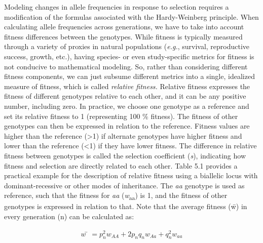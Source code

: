 \documentclass[
]{book}
\begin{document}
Modeling changes in allele frequencies in response to selection requires a modification of the formulas associated with the Hardy-Weinberg principle. When calculating allele frequencies across generations, we have to take into account fitness differences between the genotypes. While fitness is typically measured through a variety of proxies in natural populations (\emph{e.g.}, survival, reproductive success, growth, etc.), having species- or even study-specific metrics for fitness is not conducive to mathematical modeling. So, rather than considering different fitness components, we can just subsume different metrics into a single, idealized measure of fitness, which is called \emph{relative fitness.} Relative fitness expresses the fitness of different genotypes relative to each other, and it can be any positive number, including zero. In practice, we choose one genotype as a reference and set its relative fitness to 1 (representing 100 \% fitness). The fitness of other genotypes can then be expressed in relation to the reference. Fitness values are higher than the reference (\textgreater1) if alternate genotypes have higher fitness and lower than the reference (\textless1) if they have lower fitness. The difference in relative fitness between genotypes is called the selection coefficient (\emph{s}), indicating how fitness and selection are directly related to each other. Table 5.1 provides a practical example for the description of relative fitness using a biallelic locus with dominant-recessive or other modes of inheritance. The \emph{aa} genotype is used as reference, such that the fitness for \emph{aa} (\emph{w}\textsubscript{aa}) is 1, and the fitness of other genotypes is expressed in relation to that. Note that the average fitness (w̄) in every generation (n) can be calculated as:

\begin{align} 
w̄=p_n^2w_{AA}+2p_nq_nw_{Aa}+q_n^2w_{aa} \label{eq:8}
\end{align}
\end{document}
